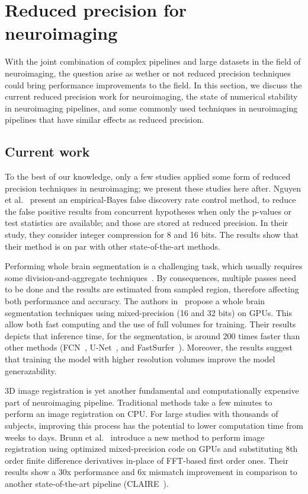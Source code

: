 \section{Reduced precision for neuroimaging} %
With the joint combination of complex pipelines and large datasets in the field 
of neuroimaging, the question arise as wether or not reduced precision techniques
could bring performance improvements to the field.
In this section, we discuss the current reduced precision work for neuroimaging,
the state of numerical stability in neuroimaging pipelines, and some commonly used
techniques in neuroimaging pipelines that have similar effects as reduced precision.
	
\subsection{Current work}
To the best of our knowledge, only a few studies applied some form of reduced precision
techniques in neuroimaging; we present these studies here after.
Nguyen et al.~\cite{Nguyen2018-lo} present an empirical-Bayes false discovery rate
control method, to reduce the false positive results from concurrent hypotheses 
when only the p-values or test statistics are available; and those are stored at reduced precision.
In their study, they consider integer compression for 8 and 16 bits.
The results show that their method is on par with other state-of-the-art methods.
	
Performing whole brain segmentation is a challenging task, which usually requires
some division-and-aggregate techniques~\cite{Li2021-rv}.
By consequences, multiple passes need to be done and the results are estimated from
sampled region, therefore affecting both performance and accuracy.
The authors in~\cite{Li2021-rv} propose a whole brain segmentation techniques 
using mixed-precision (16 and 32 bits) on GPUs.
This allow both fast computing and the use of full volumes for training.
Their results depicts that inference time, for the segmentation, is around 200 times faster
than other methods (FCN~\cite{Long2015-qr}, U-Net~\cite{Ronneberger2015-wy}, and FastSurfer~\cite{Henschel2020-vq}).
Moreover, the results suggest that training the model with higher resolution volumes
improve the model generazability.
	
3D image registration is yet another fundamental and computationally expensive part
of neuroimaging pipeline.
Traditional methods take a few minutes to perform an image registration on CPU.
For large studies with thousands of subjects, improving this process has the potential
to lower computation time from weeks to days.
Brunn et al.~\cite{Brunn2021-zj} introduce a new method to perform image registration
using optimized mixed-precision code on GPUs and substituting 8th order finite difference
derivatives in-place of FFT-based first order ones.
Their results show a 30x performance and 6x mismatch improvement in comparison to 
another state-of-the-art pipeline (CLAIRE~\cite{Mang2019-nu}).
	
